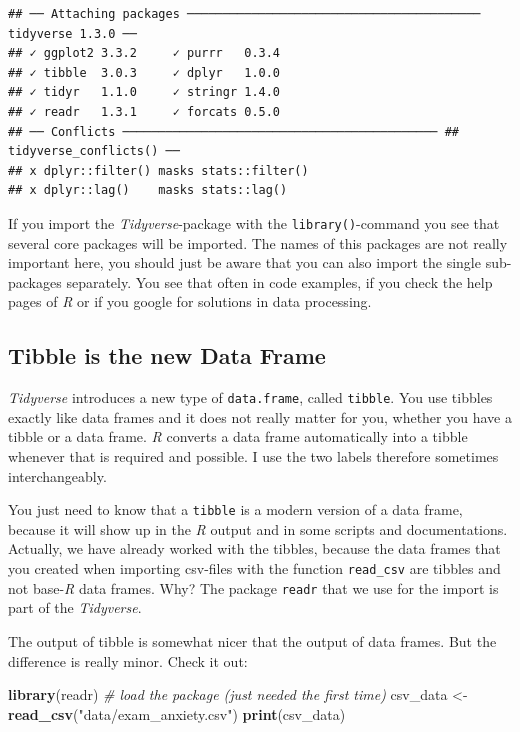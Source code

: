 \documentclass[
]{scrartcl}
\newenvironment{Shaded}{\begin{snugshade}}{\end{snugshade}}
\newcommand{\CommentTok}[1]{\textcolor[rgb]{0.56,0.35,0.01}{\textit{#1}}}
\newcommand{\KeywordTok}[1]{\textcolor[rgb]{0.13,0.29,0.53}{\textbf{#1}}}
\newcommand{\NormalTok}[1]{#1}
\newcommand{\StringTok}[1]{\textcolor[rgb]{0.31,0.60,0.02}{#1}}
\begin{document}
\begin{verbatim}
## ── Attaching packages ───────────────────────────────────────── tidyverse 1.3.0 ──
## ✓ ggplot2 3.3.2     ✓ purrr   0.3.4
## ✓ tibble  3.0.3     ✓ dplyr   1.0.0
## ✓ tidyr   1.1.0     ✓ stringr 1.4.0
## ✓ readr   1.3.1     ✓ forcats 0.5.0
## ── Conflicts ──────────────────────────────────────────── ## tidyverse_conflicts() ──
## x dplyr::filter() masks stats::filter()
## x dplyr::lag()    masks stats::lag()
\end{verbatim}

If you import the \emph{Tidyverse}-package with the \texttt{library()}-command you see that several core packages will be imported. The names of this packages are not really important here, you should just be aware that you can also import the single sub-packages separately. You see that often in code examples, if you check the help pages of \emph{R} or if you google for solutions in data processing.

\hypertarget{tibble-is-the-new-data-frame}{%
\subsection{Tibble is the new Data Frame}\label{tibble-is-the-new-data-frame}}

\emph{Tidyverse} introduces a new type of \texttt{data.frame}, called \texttt{tibble}. You use tibbles exactly like data frames and it does not really matter for you, whether you have a tibble or a data frame. \emph{R} converts a data frame automatically into a tibble whenever that is required and possible. I use the two labels therefore sometimes interchangeably.

You just need to know that a \texttt{tibble} is a modern version of a data frame, because it will show up in the \emph{R} output and in some scripts and documentations. Actually, we have already worked with the tibbles, because the data frames that you created when importing csv-files with the function \texttt{read\_csv} are tibbles and not base-\emph{R} data frames. Why? The package \texttt{readr} that we use for the import is part of the \emph{Tidyverse}.

The output of tibble is somewhat nicer that the output of data frames. But the difference is really minor. Check it out:

\begin{Shaded}
\begin{Highlighting}[]
\KeywordTok{library}\NormalTok{(readr) }\CommentTok{\# load the package (just needed the first time)}
\NormalTok{csv\_data \textless{}{-}}\StringTok{ }\KeywordTok{read\_csv}\NormalTok{(}\StringTok{"data/exam\_anxiety.csv"}\NormalTok{)}
\KeywordTok{print}\NormalTok{(csv\_data)}
\end{Highlighting}
\end{Shaded}
\end{document}
